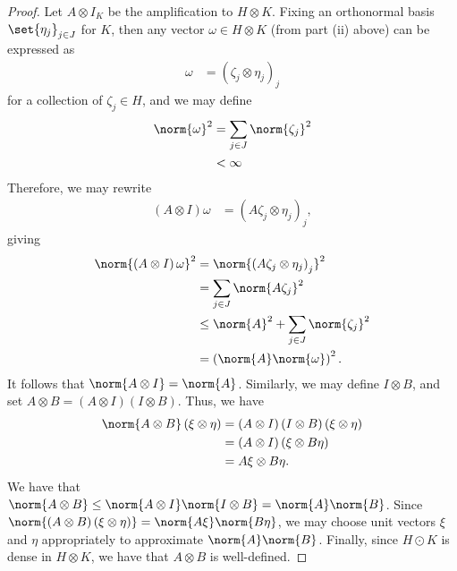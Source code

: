 \documentclass[10pt]{mypackage}
\begin{document}
\begin{proof}
  Let $A\otimes I_K$ be the amplification to $H\otimes K$. Fixing an orthonormal basis $\set{\eta_j}_{j\in J}$ for $K$, then any vector $\omega\in H\otimes K$ (from part (ii) above) can be expressed as
  \begin{align*}
    \omega &= \left( \zeta_j\otimes \eta_j \right)_j
  \end{align*}
  for a collection of $\zeta_j\in H$, and we may define
  \begin{align*}
    \norm{\omega}^2 &= \sum_{j\in J}\norm{\zeta_j}^2\\
                    &< \infty
  \end{align*}
  Therefore, we may rewrite
  \begin{align*}
    \left( A\otimes I \right)\omega &= \left( A\zeta_j\otimes \eta_j \right)_j,
  \end{align*}
  giving
  \begin{align*}
    \norm{\left( A\otimes I \right)\omega}^2 &= \norm{\left( A\zeta_j\otimes \eta_j \right)_j}^2\\
                                             &= \sum_{j\in J} \norm{A\zeta_j}^2\\
                                             &\leq \norm{A}^2 + \sum_{j\in J}\norm{\zeta_j}^2\\
                                             &= \left( \norm{A}\norm{\omega} \right)^2.
  \end{align*}
  It follows that $\norm{A\otimes I} = \norm{A}$. Similarly, we may define $I\otimes B$, and set $A\otimes B = \left( A\otimes I \right)\left( I\otimes B \right)$. Thus, we have
  \begin{align*}
    \norm{A\otimes B}\left( \xi\otimes \eta \right) &= \left( A\otimes I \right)\left( I\otimes B \right)\left( \xi\otimes\eta \right)\\
                                                    &= \left( A\otimes I \right)\left( \xi\otimes B\eta \right)\\
                                                    &= A\xi\otimes B\eta.
  \end{align*}
  We have that $\norm{A\otimes B}\leq \norm{A\otimes I}\norm{I\otimes B} = \norm{A}\norm{B}$. Since $\norm{\left( A\otimes B \right)\left( \xi\otimes\eta \right)} = \norm{A\xi}\norm{B\eta}$, we may choose unit vectors $\xi$ and $\eta$ appropriately to approximate $\norm{A}\norm{B}$. Finally, since $H\odot K$ is dense in $H\otimes K$, we have that $A\otimes B$ is well-defined.
\end{proof}
\end{document}
